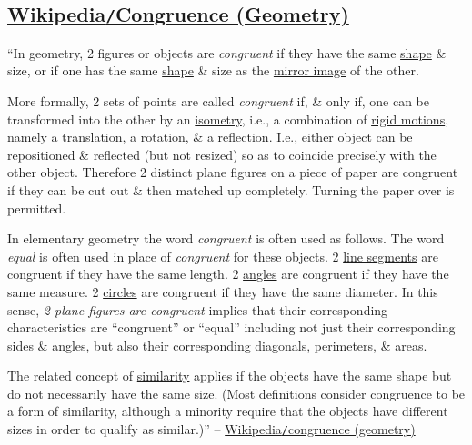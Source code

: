 \documentclass{article}
\begin{document}
\subsection{\href{https://en.wikipedia.org/wiki/Congruence_(geometry)}{Wikipedia\texttt{/}Congruence (Geometry)}}
``In geometry, 2 figures or objects are \textit{congruent} if they have the same \href{https://en.wikipedia.org/wiki/Shape}{shape} \& size, or if one has the same \href{https://en.wikipedia.org/wiki/Shape}{shape} \& size as the \href{https://en.wikipedia.org/wiki/Mirror_image}{mirror image} of the other.

More formally, 2 sets of points are called \textit{congruent} if, \& only if, one can be transformed into the other by an \href{https://en.wikipedia.org/wiki/Isometry}{isometry}, i.e., a combination of \href{https://en.wikipedia.org/wiki/Rigid_motion}{rigid motions}, namely a \href{https://en.wikipedia.org/wiki/Translation_(geometry)}{translation}, a \href{https://en.wikipedia.org/wiki/Rotation}{rotation}, \& a \href{https://en.wikipedia.org/wiki/Reflection_(mathematics)}{reflection}. I.e., either object can be repositioned \& reflected (but not resized) so as to coincide precisely with the other object. Therefore 2 distinct plane figures on a piece of paper are congruent if they can be cut out \& then matched up completely. Turning the paper over is permitted.

In elementary geometry the word \textit{congruent} is often used as follows. The word \textit{equal} is often used in place of \textit{congruent} for these objects. 2 \href{https://en.wikipedia.org/wiki/Line_segment}{line segments} are congruent if they have the same length. 2 \href{https://en.wikipedia.org/wiki/Angle}{angles} are congruent if they have the same measure. 2 \href{https://en.wikipedia.org/wiki/Circle}{circles} are congruent if they have the same diameter. In this sense, \textit{2 plane figures are congruent} implies that their corresponding characteristics are ``congruent'' or ``equal'' including not just their corresponding sides \& angles, but also their corresponding diagonals, perimeters, \& areas.

The related concept of \href{https://en.wikipedia.org/wiki/Similarity_(geometry)}{similarity} applies if the objects have the same shape but do not necessarily have the same size. (Most definitions consider congruence to be a form of similarity, although a minority require that the objects have different sizes in order to qualify as similar.)'' -- \href{https://en.wikipedia.org/wiki/Congruence_(geometry)}{Wikipedia\texttt{/}congruence (geometry)}
\end{document}
